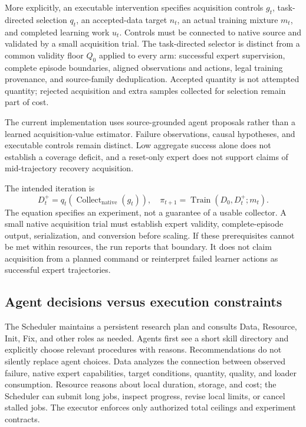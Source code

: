 \documentclass[10pt,twocolumn,letterpaper]{article}
\begin{document}
More explicitly, an executable intervention specifies acquisition controls $g_t$,
task-directed selection $q_t$, an accepted-data target $n_t$, an actual training
mixture $m_t$, and completed learning work $u_t$. Controls must be connected to
native source and validated by a small acquisition trial. The task-directed
selector is distinct from a common validity floor $Q_0$ applied to every arm:
successful expert supervision, complete episode boundaries, aligned observations
and actions, legal training provenance, and source-family deduplication.
Accepted quantity is not attempted quantity; rejected acquisition and extra
samples collected for selection remain part of cost.

The current implementation uses source-grounded agent proposals rather than a
learned acquisition-value estimator. Failure observations, causal hypotheses,
and executable controls remain distinct. Low aggregate success alone does not
establish a coverage deficit, and a reset-only expert does not support claims of
mid-trajectory recovery acquisition.

The intended iteration is
\begin{equation}
 D_t^{+}=q_t(\operatorname{Collect}_{\mathrm{native}}(g_t)),
 \quad \pi_{t+1}=\operatorname{Train}(D_0,D_t^{+};m_t).
\end{equation}
The equation specifies an experiment, not a guarantee of a usable collector.
A small native acquisition trial must establish expert validity, complete-episode
output, serialization, and conversion before scaling. If these prerequisites
cannot be met within resources, the run reports that boundary. It does not claim
acquisition from a planned command or reinterpret failed learner actions as
successful expert trajectories.

\subsection{Agent decisions versus execution constraints}
The Scheduler maintains a persistent research plan and consults Data, Resource,
Init, Fix, and other roles as needed. Agents first see a short skill directory and
explicitly choose relevant procedures with reasons. Recommendations do not silently
replace agent choices. Data analyzes the connection between observed failure,
native expert capabilities, target conditions, quantity, quality, and loader
consumption. Resource reasons about local duration, storage, and cost; the Scheduler
can submit long jobs, inspect progress, revise local limits, or cancel stalled
jobs. The executor enforces only authorized total ceilings and experiment contracts.
\end{document}
